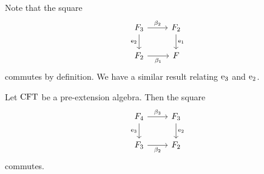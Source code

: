 \begin{comment}
\begin{proof}
It is straightforward to verify the equalities
\begin{align*}
\pullbackpr{1}{\ectxext}{\eft}\circ\beta_2\circ
  (\pullback{\pullbackpr{2}{\efamext}{\eft[2]}}{\pullbackpr{2}{\efamext}{\eft[2]}}{\efamext}{\eft[2]})
  & =
\pullbackpr{1}{\ectxext}{\eft}\circ\beta_2\circ\beta_3
  \\
\pullbackpr{2}{\ectxext}{\eft}\circ\beta_2\circ
  (\pullback{\pullbackpr{2}{\efamext}{\eft[2]}}{\pullbackpr{2}{\efamext}{\eft[2]}}{\efamext}{\eft[2]})
  & =
\pullbackpr{2}{\ectxext}{\eft}\circ\beta_2\circ\beta_3.\qedhere
\end{align*}
\end{proof}
\end{comment}

Note that the square
\begin{equation*}
\begin{tikzcd}
\stesysf_3
  \ar{r}{\beta_2}
  \ar{d}[swap]{\eext{2}}
  &
\stesysf_2
  \ar{d}{\efamext}
  \\
\stesysf_2
  \ar{r}[swap]{\beta_1}
  &
\stesysf
\end{tikzcd}
\end{equation*}
commutes by definition. We have a similar result relating $\mathrm{e}_{3}$ and
$\mathrm{e}_{2}$.

\begin{lem}
Let $\mathrm{CFT}$ be a pre-extension algebra. Then the square
\begin{equation*}
\begin{tikzcd}
\stesysf_4
  \ar{r}{\beta_3}
  \ar{d}[swap]{\eext{3}}
  &
\stesysf_3
  \ar{d}{\eext{2}}
  \\
\stesysf_3
  \ar{r}[swap]{\beta_2}
  &
\stesysf_2
\end{tikzcd}
\end{equation*}
commutes.
\end{lem}

